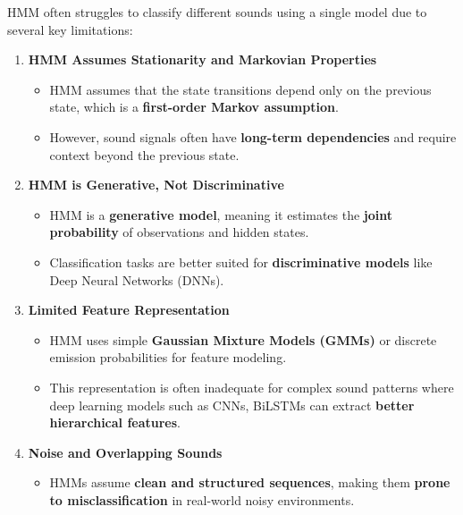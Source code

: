 \documentclass[informe,english]{practicaitic}
\begin{document}
    HMM often struggles to classify different sounds using a single model due to several key limitations:
    
    \begin{enumerate}
        \item \textbf{HMM Assumes Stationarity and Markovian Properties}
        \begin{itemize}
            \item HMM assumes that the state transitions depend only on the previous state, which is a \textbf{first-order Markov assumption}.
            \item However, sound signals often have \textbf{long-term dependencies} and require context beyond the previous state.
        \end{itemize}
    
        \item \textbf{HMM is Generative, Not Discriminative}
        \begin{itemize}
            \item HMM is a \textbf{generative model}, meaning it estimates the \textbf{joint probability} of observations and hidden states.
            \item Classification tasks are better suited for \textbf{discriminative models} like Deep Neural Networks (DNNs).
        \end{itemize}
    
        \item \textbf{Limited Feature Representation}
        \begin{itemize}
            \item HMM uses simple \textbf{Gaussian Mixture Models (GMMs)} or discrete emission probabilities for feature modeling.
            \item This representation is often inadequate for complex sound patterns where deep learning models such as CNNs, BiLSTMs can extract \textbf{better hierarchical features}.
        \end{itemize}
    
        \item \textbf{Noise and Overlapping Sounds}
        \begin{itemize}
            \item HMMs assume \textbf{clean and structured sequences}, making them \textbf{prone to misclassification} in real-world noisy environments.
        \end{itemize}
    \end{enumerate}
\end{document}
